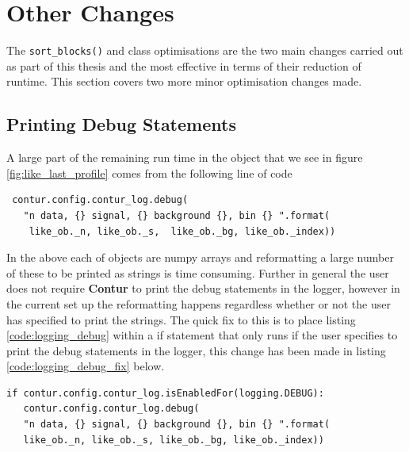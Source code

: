 \section{Other Changes}\label{sec:other_changes}
The \texttt{sort\_blocks()} and  class optimisations are the two main changes carried out as part of this thesis and the most effective in terms of their reduction of runtime. This section covers two more minor optimisation changes made.

\subsection{Printing Debug Statements}
A large part of the remaining run time in the  object that we see in figure \ref{fig:like_last_profile} comes from the following line of code

\begin{code}
\label{code:logging_debug}
\begin{verbatim}
 contur.config.contur_log.debug(
   "n data, {} signal, {} background {}, bin {} ".format(
    like_ob._n, like_ob._s,  like_ob._bg, like_ob._index))
\end{verbatim}
\end{code}

In the above each of  objects are numpy arrays and reformatting a large number of these to be printed as strings is time consuming. Further in general the user does not require \textbf{Contur} to print the debug statements in the logger, however in the current set up the reformatting happens regardless whether or not the user has specified to print the strings. The quick fix to this is to place listing \ref{code:logging_debug} within a if statement that only runs if the user specifies to print the debug statements in the logger, this change has been made in listing \ref{code:logging_debug_fix} below.

\begin{code}
\label{code:logging_debug_fix}
\begin{verbatim}
if contur.config.contur_log.isEnabledFor(logging.DEBUG):
   contur.config.contur_log.debug(
   "n data, {} signal, {} background {}, bin {} ".format(
   like_ob._n, like_ob._s, like_ob._bg, like_ob._index))
\end{verbatim}
\end{code}

